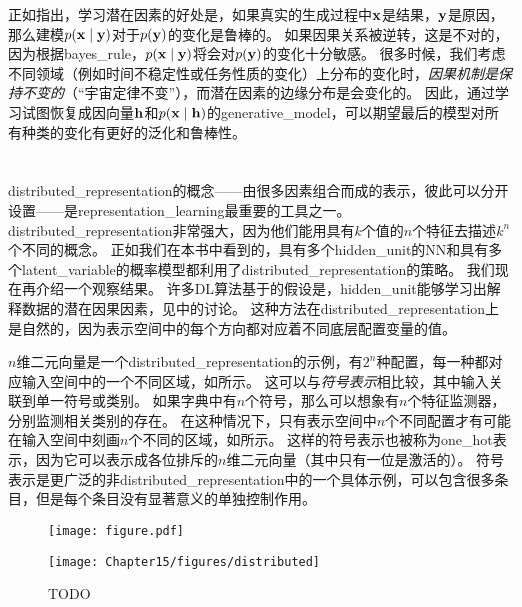 正如\cite{Janzing-et-al-ICML2012}指出，学习潜在因素的好处是，如果真实的生成过程中$\mathbf{x}$是结果，$\mathbf{y}$是原因，那么建模$p(\mathbf{x} \mid \mathbf{y})$对于$p(\mathbf{y})$的变化是鲁棒的。
如果因果关系被逆转，这是不对的，因为根据\gls{bayes_rule}，$p(\mathbf{x} \mid \mathbf{y})$将会对$p(\mathbf{y})$的变化十分敏感。
很多时候，我们考虑不同领域（例如时间不稳定性或任务性质的变化）上分布的变化时，\emph{因果机制是保持不变的}（``宇宙定律不变''），而潜在因素的边缘分布是会变化的。
因此，通过学习试图恢复成因向量$\mathbf{h}$和$p(\mathbf{x} \mid \mathbf{h})$的\gls{generative_model}，可以期望最后的模型对所有种类的变化有更好的泛化和鲁棒性。


\section{}
\label{sec:distributed_representation}
\gls{distributed_representation}的概念——由很多因素组合而成的表示，彼此可以分开设置——是\gls{representation_learning}最重要的工具之一。
\gls{distributed_representation}非常强大，因为他们能用具有$k$个值的$n$个特征去描述$k^n$个不同的概念。
正如我们在本书中看到的，具有多个\gls{hidden_unit}的\gls{NN}和具有多个\gls{latent_variable}的概率模型都利用了\gls{distributed_representation}的策略。
我们现在再介绍一个观察结果。
许多\gls{DL}算法基于的假设是，\gls{hidden_unit}能够学习出解释数据的潜在因果因素，见中的讨论。
这种方法在\gls{distributed_representation}上是自然的，因为表示空间中的每个方向都对应着不同底层配置变量的值。


$n$维二元向量是一个\gls{distributed_representation}的示例，有$2^n$种配置，每一种都对应输入空间中的一个不同区域，如所示。
这可以与\emph{符号表示}相比较，其中输入关联到单一符号或类别。
如果字典中有$n$个符号，那么可以想象有$n$个特征监测器，分别监测相关类别的存在。
在这种情况下，只有表示空间中$n$个不同配置才有可能在输入空间中刻画$n$个不同的区域，如所示。
这样的符号表示也被称为\gls{one_hot}表示，因为它可以表示成各位排斥的$n$维二元向量（其中只有一位是激活的）。
符号表示是更广泛的非\gls{distributed_representation}中的一个具体示例，可以包含很多条目，但是每个条目没有显著意义的单独控制作用。

\begin{figure}[!htb]
\ifOpenSource
\centerline{\texttt{[image: figure.pdf]}}
\else
\centerline{\texttt{[image: Chapter15/figures/distributed]}}
\fi
\caption{TODO}
\label{fig:chap15_distributed}
\end{figure}

